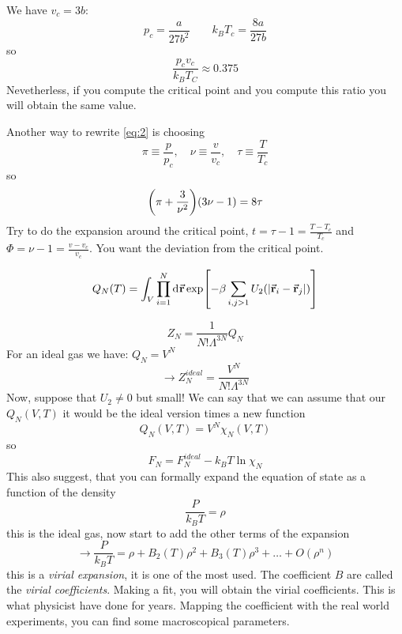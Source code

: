 \documentclass[../main/main.tex]{subfiles}
\begin{document}
We have  \( v_c = 3 b \):
\begin{equation}
  p_c = \frac{a}{27 b^2} \qquad k_B T_c = \frac{8a}{27b}
\end{equation}
so
\begin{equation}
  \frac{p_c v_c}{k_B T_C} \approx 0.375
\end{equation}
Nevetherless, if you compute the critical point and you compute this ratio you will obtain the same value.

Another way to rewrite \eqref{eq:2} is choosing
\begin{equation}
  \pi \equiv \frac{p}{p_c}, \quad \nu  \equiv \frac{v}{v_c}, \quad \tau \equiv \frac{T}{T_c}
\end{equation}
so
\begin{equation}
  \qty(\pi + \frac{3}{\nu ^2}) \qty(3 \nu -1) = 8 \tau
\end{equation}
Try to do the expansion around the critical point, \( t = \tau -1 = \frac{T-T_c}{T_c}\) and \( \Phi = \nu -1 = \frac{v-v_c}{v_c} \). You want the deviation from the critical point.


\begin{equation}
  Q_N (T) = \int_{V}^{} \prod_{i=1}^{N}  \dd[]{\va{r}}  \exp [-\beta \sum_{i,j > 1 }^{}  U_2 ( \abs{\va{r}_i - \va{r}_j} ) ]
\end{equation}

\begin{equation}
  Z_N = \frac{1}{N! \Lambda ^{3N} } Q_N
\end{equation}
For an ideal gas we have: \( Q_N = V^N \)
\begin{equation}
  \rightarrow Z_N^{ideal} = \frac{V^N}{N! \Lambda ^{3N}}
\end{equation}
Now, suppose that \( U_2 \neq 0  \) but small! We can say that we can assume that our \( Q_N (V,T) \) it would be the ideal version times a new function
\begin{equation}
  Q_N (V,T)=V^N \chi _N (V,T)
\end{equation}
so
\begin{equation}
  F_N = F_N^{ideal} - k_B T \ln{\chi _N}
\end{equation}
This also suggest, that you can formally expand the equation of state as a function of the density
\begin{equation}
  \frac{P}{k_B T} = \rho
\end{equation}
this is the ideal gas, now start to add the other terms of the expansion
\begin{equation}
  \rightarrow \frac{P}{k_B T} = \rho + B_2 (T) \rho ^2 + B_3 (T)\rho ^3+ \dots + O(\rho ^n)
\end{equation}
this is a \emph{virial expansion}, it is one of the most used. The coefficient \( B \) are called the \emph{virial coefficients}.  Making a fit, you will obtain the virial coefficients. This is what physicist have done for years. Mapping the coefficient with the real world experiments, you can find some macroscopical parameters.
\end{document}
